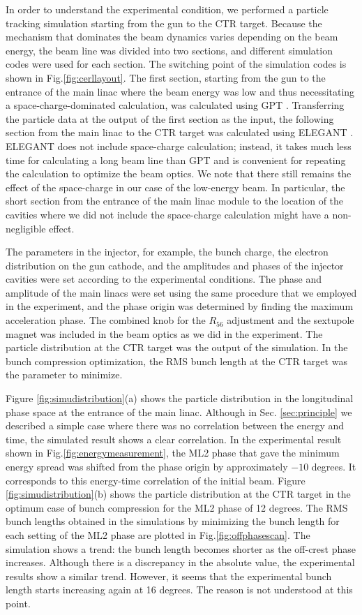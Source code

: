 \documentclass[review]{elsarticle}
\begin{document}
In order to understand the experimental condition,
we performed a particle tracking simulation starting from the gun to the CTR target.
Because the mechanism that dominates the beam dynamics varies depending on the beam energy,
the beam line was divided into two sections,
and different simulation codes were used for each section.
The switching point of the simulation codes
is shown in Fig.\ref{fig:cerllayout}.
The first section,
starting from the gun to the entrance of the main linac
where the beam energy was low 
and thus necessitating a space-charge-dominated calculation,
was calculated using GPT \cite{gpt}.
Transferring the particle data at the output of the first section as the input,
the following section from the main linac to the CTR target
was calculated using ELEGANT \cite{ele}.
ELEGANT does not include space-charge calculation;
instead, it takes much less time for calculating a long beam line than GPT
and is convenient for repeating the calculation to optimize the beam optics.
We note that there still remains 
the effect of the space-charge in our case of the low-energy beam.
In particular, the short section from
the entrance of the main linac module to the location of the cavities
where we did not include the space-charge calculation
might have a non-negligible effect.

The parameters in the injector,
for example,
 the bunch charge, the electron distribution on the gun cathode,
and the amplitudes and phases of the injector cavities
were set according to the experimental conditions.
The phase and amplitude of the main linacs were set
using the same procedure that we employed in the experiment,
and the phase origin was determined 
by finding the maximum acceleration phase.
The combined knob for the $R_{56}$ adjustment
and the sextupole magnet was included in the beam optics
as we did in the experiment.
The particle distribution at the CTR target
was the output of the simulation.
In the bunch compression optimization,
the RMS bunch length at the CTR target was the parameter to minimize.

Figure \ref{fig:simudistribution}(a)
shows the particle distribution in the longitudinal phase space
at the entrance of the main linac.
Although in Sec. \ref{sec:principle}
we described a simple case where
there was no correlation between the energy and time,
the simulated result shows a clear correlation.
In the experimental result shown in Fig.\ref{fig:energymeasurement},
the ML2 phase that gave the minimum energy spread
was shifted from the phase origin by approximately $-10$ degrees.
It corresponds to this energy-time correlation of the initial beam.
Figure \ref{fig:simudistribution}(b)
shows the particle distribution at the CTR target
in the optimum case of bunch compression for the ML2 phase of 12 degrees.
The RMS bunch lengths obtained 
in the simulations by minimizing the bunch length
for each setting of the ML2 phase
are plotted in Fig.\ref{fig:offphasescan}.
The simulation shows a trend:
the bunch length becomes shorter as the off-crest phase increases.
Although there is a discrepancy in the absolute value,
the experimental results show a similar trend.
However,
it seems that the experimental bunch length starts increasing again at 16 degrees.
The reason is not understood at this point.
\end{document}
